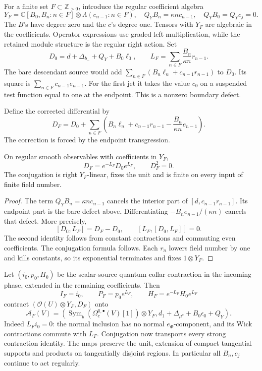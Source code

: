 For a finite set \(F\subset\mathbb Z_{>0}\), introduce the regular
coefficient algebra
\[
 Y_F=\mathbb C[B_0,B_n:n\in F]\otimes\Lambda(c_{n-1}:n\in F),
 \quad Q_YB_n=\kappa n c_{n-1},\quad Q_YB_0=Q_Yc_j=0.
\]
The \(B\)'s have degree zero and the \(c\)'s degree one. Tensors with
\(Y_F\) are algebraic in the coefficients. Operator expressions use
graded left multiplication, while the retained module structure is the
regular right action.
Set
\[
 D_0=d+\Delta_{b_-}+Q_Y+B_0\ell_0,
 \qquad L_F=\sum_{n\in F}\frac{B_n}{\kappa n}r_{n-1}.
\]
The bare descendant source would add
\(\sum_{n\in F}(B_n\ell_n+c_{n-1}r_{n-1})\) to \(D_0\).
Its square is \(\sum_{n\in F}c_{n-1}e_{n-1}\).
For the first jet it takes the value \(c_0\) on a suspended test function
equal to one at the endpoint. This is a nonzero boundary defect.

Define the corrected differential by
\begin{equation}\label{eq:vol2-native-corrected-source}
 D_F=D_0+\sum_{n\in F}
       \left(B_n\ell_n+c_{n-1}r_{n-1}
                         -\frac{B_n}{\kappa n}e_{n-1}\right).
\end{equation}
The correction is forced by the endpoint transgression.

\begin{proposition}\label{prop:vol2-native-source-gauge}
On regular smooth observables with coefficients in \(Y_F\),
\[
                 D_F=e^{-L_F}D_0e^{L_F},\qquad D_F^2=0.
\]
The conjugation is right \(Y_F\)-linear, fixes the unit and is finite
on every input of finite field number.
\end{proposition}

\begin{proof}
The term \(Q_YB_n=\kappa nc_{n-1}\) cancels the interior part of
\([d,c_{n-1}r_{n-1}]\). Its endpoint part is the bare defect above.
Differentiating \(-B_ne_{n-1}/(\kappa n)\) cancels that defect.
More precisely,
\[
 [D_0,L_F]=D_F-D_0,
 \qquad [L_F,[D_0,L_F]]=0.
\]
The second identity follows from constant contractions and commuting
even coefficients. The conjugation formula follows. Each \(r_n\)
lowers field number by one and kills constants, so its exponential
terminates and fixes \(1\otimes Y_F\).
\end{proof}

Let \((i_0,p_0,H_0)\) be the scalar-source quantum collar contraction in
the incoming phase, extended in the remaining coefficients. Then
\[
 I_F=i_0,
 \qquad P_F=p_0e^{L_F},
 \qquad H_F=e^{-L_F}H_0e^{L_F}
\]
contract \((\mathcal O(U)\otimes Y_F,D_F)\) onto
\[
 \mathcal A_F(V)=
 \left(\operatorname{Sym}_b(\Omega_c^{0,\bullet}(V)[1])\otimes Y_F,
         d_1+\Delta_{\mu^s}+B_0\epsilon_0+Q_Y\right).
\]
Indeed \(L_Fi_0=0\): the normal inclusion has no normal
\(e_\Phi\)-component, and its Wick contractions commute with \(L_F\).
Conjugation now transports every strong contraction identity.
The maps preserve the unit, extension of compact tangential supports
and products on tangentially disjoint regions. In particular all
\(B_n,c_j\) continue to act regularly.

